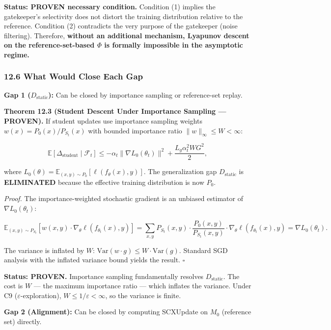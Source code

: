 \documentclass[
  12pt,
]{ctexart}
\begin{document}
\textbf{Status: PROVEN necessary condition.} Condition (1) implies the
gatekeeper's selectivity does not distort the training distribution
relative to the reference. Condition (2) contradicts the very purpose of
the gatekeeper (noise filtering). Therefore, \textbf{without an
additional mechanism, Lyapunov descent on the reference-set-based
\(\Phi\) is formally impossible in the asymptotic regime.}

\subsubsection{12.6 What Would Close Each
Gap}\label{what-would-close-each-gap}

\textbf{Gap 1 (\(D_{\text{static}}\)):} Can be closed by importance
sampling or reference-set replay.

\textbf{Theorem 12.3 (Student Descent Under Importance Sampling ---
PROVEN).} If student updates use importance sampling weights
\(w(x) = P_0(x) / P_{S_t}(x)\) with bounded importance ratio
\(\|w\|_\infty \leq W < \infty\):

\[\mathbb{E}[\Delta_{\text{student}} \mid \mathcal{F}_t] \leq -\alpha_t \|\nabla L_0(\theta_t)\|^2 + \frac{L_g \alpha_t^2 W G^2}{2},\]

where
\(L_0(\theta) = \mathbb{E}_{(x,y) \sim P_0}[\ell(f_\theta(x), y)]\). The
generalization gap \(D_{\text{static}}\) is \textbf{ELIMINATED} because
the effective training distribution is now \(P_0\).

\emph{Proof.} The importance-weighted stochastic gradient is an unbiased
estimator of \(\nabla L_0(\theta_t)\):

\[\mathbb{E}_{(x,y) \sim P_{S_t}}[w(x,y) \cdot \nabla_\theta \ell(f_{\theta_t}(x), y)] = \sum_{x,y} P_{S_t}(x,y) \cdot \frac{P_0(x,y)}{P_{S_t}(x,y)} \cdot \nabla_\theta \ell(f_{\theta_t}(x), y) = \nabla L_0(\theta_t).\]

The variance is inflated by \(W\):
\(\text{Var}(w \cdot g) \leq W \cdot \text{Var}(g)\). Standard SGD
analysis with the inflated variance bound yields the result. \(\square\)

\textbf{Status: PROVEN.} Importance sampling fundamentally resolves
\(D_{\text{static}}\). The cost is \(W\) --- the maximum importance
ratio --- which inflates the variance. Under C9
(\(\varepsilon\)-exploration), \(W \leq 1/\varepsilon < \infty\), so the
variance is finite.

\textbf{Gap 2 (Alignment):} Can be closed by computing SCXUpdate on
\(M_0\) (reference set) directly.
\end{document}
